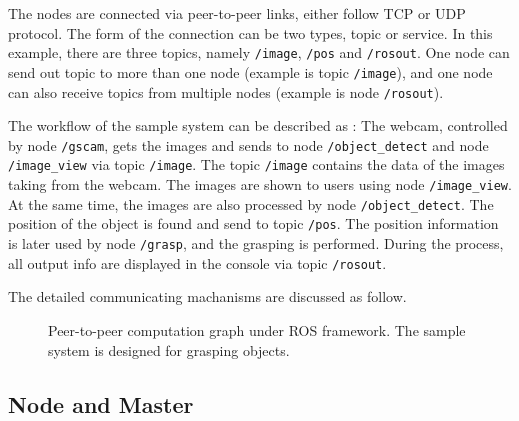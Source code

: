 \documentclass[a4paper, 10pt, conference]{ieeeconf}       %
\begin{document}
The nodes are connected via peer-to-peer links, either follow TCP or UDP protocol. The form of the connection can be two types, topic or service. In this example, there are three topics, namely \texttt{/image}, \texttt{/pos} and \texttt{/rosout}. One node can send out topic to more than one node (example is topic \texttt{/image}), and one node can also receive topics from multiple nodes (example is node \texttt{/rosout}). 

The workflow of the sample system can be described as : The webcam, controlled by node \texttt{/gscam}, gets the images and sends to node \texttt{/object\_detect} and node \texttt{/image\_view} via topic \texttt{/image}. The topic \texttt{/image} contains the data of the images taking from the webcam. The images are shown to users using node \texttt{/image\_view}. At the same time, the images are also processed by node \texttt{/object\_detect}. The position of the object is found and send to topic \texttt{/pos}. The position information is later used by node \texttt{/grasp}, and the grasping is performed. During the process, all output info are displayed in the console via topic \texttt{/rosout}.

The detailed communicating machanisms are discussed as follow.

\begin{figure}[htpb]
  \centering
  \caption{Peer-to-peer computation graph under ROS framework. The sample system is designed for grasping objects.}
  \label{fig:framework}
\end{figure}



\subsection{Node and Master}
\end{document}
